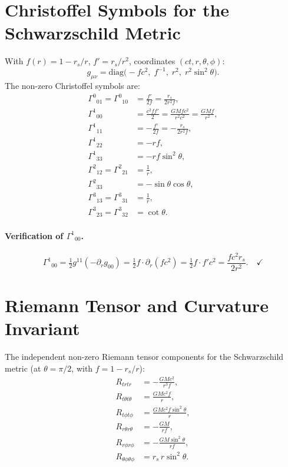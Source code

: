 \documentclass[12pt,a4paper]{article}
\theoremstyle{plain}
\theoremstyle{definition}
\theoremstyle{remark}
\begin{document}
\section{Christoffel Symbols for the Schwarzschild Metric}\label{app:christoffel}

With $f(r) = 1-r_s/r$, $f'=r_s/r^2$, coordinates $(ct,r,\theta,\phi)$:
\[
  g_{\mu\nu} = \mathrm{diag}\!\bigl(-fc^2,\;f^{-1},\;r^2,\;r^2\sin^2\theta\bigr).
\]
The non-zero Christoffel symbols are:
\begin{align*}
  \Gamma^0{}_{01} = \Gamma^0{}_{10} &= \frac{f'}{2f} = \frac{r_s}{2r^2f}, \\
  \Gamma^1{}_{00} &= \frac{c^2ff'}{2} = \frac{GMfc^2}{r^2c^2} = \frac{GMf}{r^2},\\
  \Gamma^1{}_{11} &= -\frac{f'}{2f} = -\frac{r_s}{2r^2f},\\
  \Gamma^1{}_{22} &= -rf,\\
  \Gamma^1{}_{33} &= -rf\sin^2\theta,\\
  \Gamma^2{}_{12} = \Gamma^2{}_{21} &= \frac{1}{r},\\
  \Gamma^2{}_{33} &= -\sin\theta\cos\theta,\\
  \Gamma^3{}_{13} = \Gamma^3{}_{31} &= \frac{1}{r},\\
  \Gamma^3{}_{23} = \Gamma^3{}_{32} &= \cot\theta.
\end{align*}

\paragraph{Verification of $\Gamma^1{}_{00}$.}
\[
  \Gamma^1{}_{00} = \tfrac{1}{2}g^{11}(-\partial_r g_{00})
  = \tfrac{1}{2}f\cdot\partial_r(fc^2)
  = \tfrac{1}{2}f\cdot f'c^2
  = \frac{fc^2r_s}{2r^2}. \quad\checkmark
\]

\section{Riemann Tensor and Curvature Invariant}\label{app:riemann}

The independent non-zero Riemann tensor components for the Schwarzschild metric (at $\theta=\pi/2$, with $f=1-r_s/r$):
\begin{align*}
  R_{trtr} &= -\frac{GMc^2}{r^3f},\\
  R_{t\theta t\theta} &= \frac{GMc^2 f}{r},\\
  R_{t\phi t\phi} &= \frac{GMc^2 f\sin^2\theta}{r},\\
  R_{r\theta r\theta} &= -\frac{GM}{rf},\\
  R_{r\phi r\phi} &= -\frac{GM\sin^2\theta}{rf},\\
  R_{\theta\phi\theta\phi} &= r_s\,r\sin^2\theta.
\end{align*}
\end{document}
